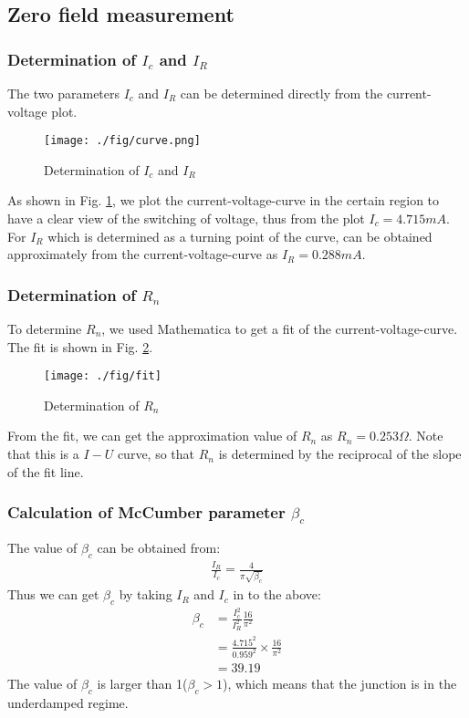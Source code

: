 \subsection{Zero field measurement}

\subsubsection{Determination of $I_{c}$ and $I_{R}$}
The two parameters $I_{c}$ and $I_{R}$ can be determined directly from the current-voltage plot.


\begin{figure}[h]
\centering
\texttt{[image: ./fig/curve.png]}
\caption{Determination of $I_{c}$ and $I_{R}$}
\label{UIcurvePicture}
\end{figure}


As shown in Fig. \ref{UIcurvePicture}, we plot the current-voltage-curve in the certain region to have a clear view of the switching of voltage,
thus from the plot $I_{c}=4.715mA$. For $I_{R}$ which is determined as a turning point of the curve, can be obtained approximately from the current-voltage-curve as $I_R=0.288mA$.
\subsubsection{Determination of $R_{n}$}
To determine $R_{n}$, we used Mathematica to get a fit of the current-voltage-curve. The fit is shown in Fig. \ref{determinationRNfigure}.

\begin{figure}[h]
\centering
\texttt{[image: ./fig/fit]}
\caption{Determination of $R_{n}$}
\label{determinationRNfigure}
\end{figure}


From the fit, we can get the approximation value of $R_{n}$ as $R_{n}=0.253\Omega$. Note that this is a $I-U$ curve, so that $R_{n}$ is determined by the reciprocal of the slope of the fit line.

\subsubsection{Calculation of McCumber parameter $\beta_{c}$}
The value of $\beta_{c}$ can be obtained from:
\begin{align*}
\frac{I_{R}}{I_{c}}=\frac{4}{\pi\sqrt{\beta_{c}}}
\end{align*}
Thus we can get $\beta_{c}$ by taking $I_{R}$ and $I_{c}$ in to the above:
\begin{align*}
\beta_c & =\frac{I_{c}^2}{I_{R}^2}\frac{16}{\pi^2}\\
    & =\frac{4.715^2}{0.959^2}\times\frac{16}{\pi^2}\\
    & =39.19
\end{align*}
The value of $\beta_c$ is larger than 1($\beta_{c}>1$), which means that the junction is in the underdamped regime.

